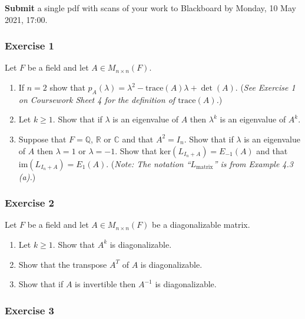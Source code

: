 \documentclass[
  12pt,
  a4paper,
  twoside]{article}
\theoremstyle{plain}
\theoremstyle{definition}
\begin{document}
\textbf{Submit} a single pdf with scans of your work to Blackboard by Monday, 10 May 2021, 17:00.

\hypertarget{exercise-1-8}{%
\subsubsection*{Exercise 1}\label{exercise-1-8}}

Let \(F\) be a field and let \(A \in M_{n\times n}(F)\).

\begin{enumerate}
\def\labelenumi{(\alph{enumi})}
\item
  If \(n=2\) show that \(p_A(\lambda) = \lambda^2 - \textrm{trace}(A) \lambda + \det(A)\). (\emph{See
  Exercise 1 on Coursework Sheet 4 for the definition of \(\textrm{trace}(A)\).})
\item
  Let \(k \ge 1\). Show that if \(\lambda\) is an eigenvalue of \(A\)
  then \(\lambda^k\) is an eigenvalue of \(A^k\).
\item
  Suppose that \(F = \mathbb{Q}\), \(\mathbb{R}\) or \(\mathbb{C}\) and that \(A^2 = I_n\).
  Show that if \(\lambda\) is an eigenvalue of \(A\) then \(\lambda = 1\)
  or \(\lambda = -1\).
  Show that \(\textrm{ker}(L_{I_n +A}) = E_{-1}(A)\) and that \(\textrm{im}(L_{I_n+A}) = E_1(A)\).
  (\emph{Note: The notation ``\(L_{\mathrm{matrix}}\)'' is from Example 4.3 (a).})
\end{enumerate}

\hypertarget{exercise-2-8}{%
\subsubsection*{Exercise 2}\label{exercise-2-8}}

Let \(F\) be a field and let \(A \in M_{n\times n}(F)\) be a
diagonalizable matrix.

\begin{enumerate}
\def\labelenumi{(\alph{enumi})}
\item
  Let \(k\ge 1\). Show that \(A^k\) is diagonalizable.
\item
  Show that the transpose \(A^T\) of \(A\) is diagonalizable.
\item
  Show that if \(A\) is invertible then \(A^{-1}\) is
  diagonalizable.
\end{enumerate}

\hypertarget{exercise-3-8}{%
\subsubsection*{Exercise 3}\label{exercise-3-8}}
\end{document}
